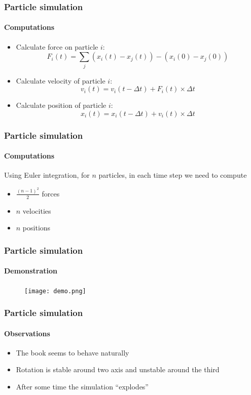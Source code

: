 \documentclass{beamer}
\begin{document}
\begin{frame}
 \frametitle{Particle simulation}
 \framesubtitle{Computations}
 \begin{itemize}
  \item Calculate force on particle $i$:
  \begin{displaymath}
   F_i(t) = \sum_j (x_i(t) - x_j(t)) - (x_i(0) - x_j(0))
  \end{displaymath}
  \item Calculate velocity of particle $i$:
  \begin{displaymath}
   v_i(t) = v_i(t - \Delta t) + F_i(t) \times \Delta t
  \end{displaymath}
  \item Calculate position of particle $i$:
  \begin{displaymath}
   x_i(t) = x_i(t - \Delta t) + v_i(t) \times \Delta t
  \end{displaymath}
 \end{itemize}
\end{frame}

\begin{frame}
 \frametitle{Particle simulation}
 \framesubtitle{Computations}
 Using Euler integration, for $n$ particles, in each time step we need to compute
 \begin{itemize}
  \item $\frac{(n-1)^2}{2}$ forces
  \item $n$ velocities
  \item $n$ positions
 \end{itemize}
\end{frame}

\begin{frame}
 \frametitle{Particle simulation}
 \framesubtitle{Demonstration}
 \begin{figure}
  \centering
  \texttt{[image: demo.png]}
 \end{figure}
\end{frame}

\begin{frame}
 \frametitle{Particle simulation}
 \framesubtitle{Observations}
 \begin{itemize}
  \item The book seems to behave naturally
  \item Rotation is stable around two axis and unstable around the third
  \item After some time the simulation ``explodes''
 \end{itemize}
\end{frame}
\end{document}
